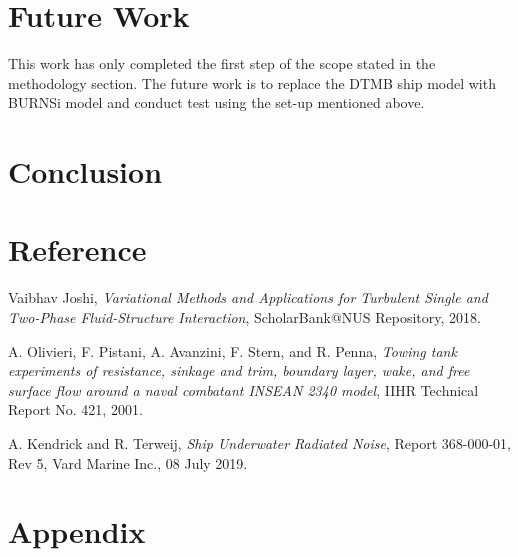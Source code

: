 \documentclass[12pt]{article} %
\begin{document}
\section{Future Work}
This work has only completed the first step of the scope stated in the methodology section. The future work is to replace the DTMB ship model with BURNSi model and conduct
test using the set-up mentioned above.
\section{Conclusion}



\section{Reference}
\begin{thebibliography}{99}
    Vaibhav Joshi, \emph{Variational Methods and Applications for Turbulent Single and Two-Phase Fluid-Structure Interaction}, ScholarBank@NUS Repository, 2018.

    A. Olivieri, F. Pistani, A. Avanzini, F. Stern, and R. Penna, \emph{Towing tank experiments of resistance, sinkage and trim, boundary layer, wake, and free surface flow around a naval combatant INSEAN 2340 model}, IIHR Technical Report No. 421, 2001.
    
    A. Kendrick and R. Terweij, \emph{Ship Underwater Radiated Noise}, Report 368-000-01, Rev 5, Vard Marine Inc., 08 July 2019.
   
    
    
    
\end{thebibliography}

\section{Appendix}
\end{document}
